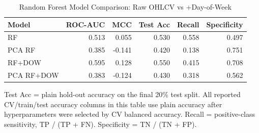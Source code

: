 \begin{table}[htbp]
\centering
\caption{Random Forest Model Comparison: Raw OHLCV vs +Day-of-Week}
\label{tab:base_rf_comparison}
\begin{tabular}{lrrrrr}
\toprule
Model & ROC-AUC & MCC & Test Acc & Recall & Specificity \\
\midrule
RF & 0.513 & 0.055 & 0.530 & 0.558 & 0.497 \\
PCA RF & 0.385 & -0.141 & 0.420 & 0.138 & 0.751 \\
\midrule
RF+DOW & 0.595 & 0.128 & 0.550 & 0.415 & 0.708 \\
PCA RF+DOW & 0.383 & -0.124 & 0.430 & 0.318 & 0.562 \\
\bottomrule
\end{tabular}
\par\smallskip
\footnotesize Test Acc = plain hold-out accuracy on the final 20\% test split. All reported CV/train/test accuracy columns in this table use plain accuracy after hyperparameters were selected by CV balanced accuracy. Recall = positive-class sensitivity, TP / (TP + FN). Specificity = TN / (TN + FP).
\end{table}
